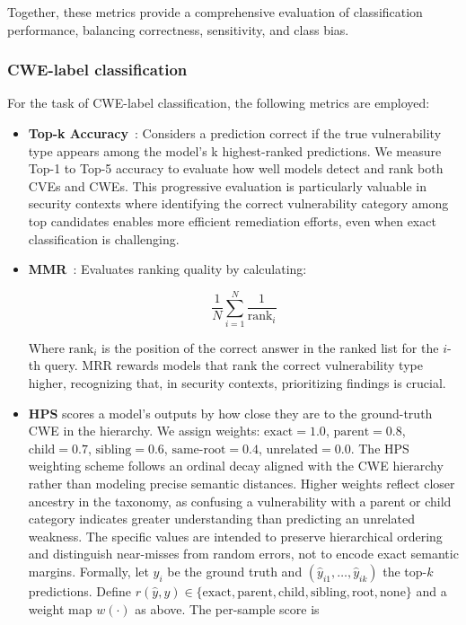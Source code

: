 \documentclass[lettersize,journal]{IEEEtran}
\begin{document}
Together, these metrics provide a comprehensive evaluation of classification performance, balancing correctness, sensitivity, and class bias.

\subsubsection{CWE-label classification}
\label{section:cwe_metrics}
For the task of CWE-label classification, the following metrics are employed:

\begin{itemize}

	\item \textbf{Top-k Accuracy}~\cite{russakovsky2015imagenet}: Considers a prediction correct if the true vulnerability type appears among the model's k highest-ranked predictions. We measure Top-1 to Top-5 accuracy to evaluate how well models detect and rank both CVEs and CWEs. This progressive evaluation is particularly valuable in security contexts where identifying the correct vulnerability category among top candidates enables more efficient remediation efforts, even when exact classification is challenging.

	\item \textbf{\gls{MMR}}~\cite{craswell2009mean}: Evaluates ranking quality by calculating:
    
    \begin{equation}
        \frac{1}{N}\sum_{i=1}^{N}\frac{1}{\text{rank}_i}
    \end{equation}
    
    Where $\text{rank}_i$ is the position of the correct answer in the ranked list for the $i$-th query. MRR rewards models that rank the correct vulnerability type higher, recognizing that, in security contexts, prioritizing findings is crucial.

    \item \textbf{\gls{HPS}} scores a model's outputs by how close they are to the ground-truth \gls{CWE} in the hierarchy. We assign weights: $\text{exact}=1.0$, $\text{parent}=0.8$, $\text{child}=0.7$, $\text{sibling}=0.6$, $\text{same-root}=0.4$, $\text{unrelated}=0.0$. The HPS weighting scheme follows an ordinal decay aligned with the CWE hierarchy rather than modeling precise semantic distances. Higher weights reflect closer ancestry in the taxonomy, as confusing a vulnerability with a parent or child category indicates greater understanding than predicting an unrelated weakness. The specific values are intended to preserve hierarchical ordering and distinguish near-misses from random errors, not to encode exact semantic margins. Formally, let $y_i$ be the ground truth and $(\hat y_{i1},\dots,\hat y_{ik})$ the top-$k$ predictions. Define $r(\hat y,y)\in\{\text{exact},\text{parent},\text{child},\text{sibling},\text{root},\text{none}\}$ and a weight map $w(\cdot)$ as above. The per-sample score is
    

\end{itemize}
\end{document}
